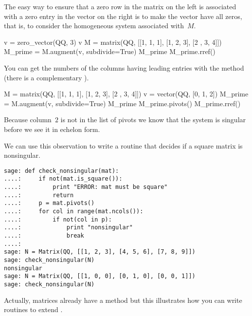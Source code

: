 The easy way to ensure that a zero row in the matrix 
on the left is associated with a zero
entry in the vector on the right is to make the vector have all zeros, that is,
to consider the homogeneous system associated with~$M$.
\begin{sageoutput}
v = zero_vector(QQ, 3)
v
M = matrix(QQ, [[1, 1, 1], [1, 2, 3], [2 , 3, 4]]) 
M_prime = M.augment(v, subdivide=True)
M_prime
M_prime.rref()
\end{sageoutput}

You can get the numbers of the columns having leading entries with 
the  method
(there is a complementary ).
\begin{sageoutput}[d,0,3]
M = matrix(QQ, [[1, 1, 1], [1, 2, 3], [2 , 3, 4]]) 
v = vector(QQ, [0, 1, 2])
M_prime = M.augment(v, subdivide=True)
M_prime                  
M_prime.pivots()         
M_prime.rref()
\end{sageoutput}
\noindent
Because column~$2$ is not in the list of pivots we know that the
system is singular before we see it in echelon form.

We can use this observation to write a routine that decides if a 
square matrix is nonsingular.
         
\begin{lstlisting}
sage: def check_nonsingular(mat):
....:     if not(mat.is_square()):
....:         print "ERROR: mat must be square"
....:         return
....:     p = mat.pivots()
....:     for col in range(mat.ncols()):
....:         if not(col in p):
....:             print "nonsingular"
....:             break
....:          
sage: N = Matrix(QQ, [[1, 2, 3], [4, 5, 6], [7, 8, 9]])
sage: check_nonsingular(N)                                
nonsingular
sage: N = Matrix(QQ, [[1, 0, 0], [0, 1, 0], [0, 0, 1]])
sage: check_nonsingular(N)                                   
\end{lstlisting}
\noindent
Actually, \Sage{} matrices already have a method 
but this illustrates how you can write routines to extend \Sage.






